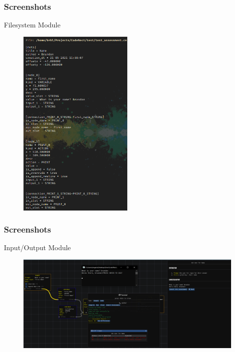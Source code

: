 \documentclass{beamer}
\begin{document}
\begin{frame}
	\frametitle{Screenshots}
	\begin{block}{Filesystem Module}
		\begin{figure}
			\includegraphics[width=0.5\textwidth]{../tex/media/sc_project_file.png}
		\end{figure}
	\end{block}
\end{frame}

\begin{frame}
	\frametitle{Screenshots}
	\begin{block}{Input/Output Module}
		\begin{figure}
			\includegraphics[width=1\textwidth]{../tex/media/sc_assessments_run.png}
		\end{figure}
	\end{block}
\end{frame}
\end{document}

